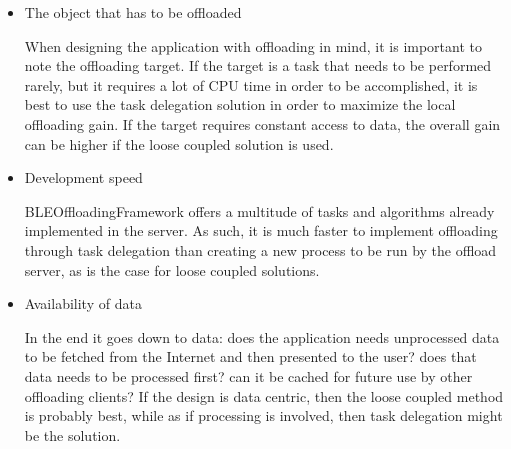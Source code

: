 \begin{itemize}

\item{The object that has to be offloaded}
	
	When designing the application with offloading in mind, it is important to note the offloading target. If the target is a task that needs to be performed rarely, but it requires a lot of CPU time in order to be accomplished, it is best to use the task delegation solution in order to maximize the local offloading gain. If the target requires constant access to data, the overall gain can be higher if the loose coupled solution is used.
	
\item{Development speed}

	BLEOffloadingFramework offers a multitude of tasks and algorithms already implemented in the server. As such, it is much faster to implement offloading through task delegation than creating a new process to be run by the offload server, as is the case for loose coupled solutions.

\item{Availability of data}

	In the end it goes down to data: does the application needs unprocessed data to be fetched from the Internet and then presented to the user? does that data needs to be processed first? can it be cached for future use by other offloading clients? If the design is data centric, then the loose coupled method is probably best, while as if processing is involved, then task delegation might be the solution.

\end{itemize}